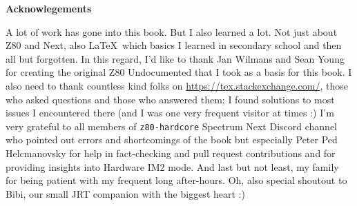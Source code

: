 \begingroup

	\textbf{Acknowlegements}

	A lot of work has gone into this book. But I also learned a lot. Not just about Z80 and Next, also \LaTeX~which basics I learned in secondary school and then all but forgotten. In this regard, I'd like to thank Jan Wilmans and Sean Young for creating the original Z80 Undocumented that I took as a basis for this book. I also need to thank countless kind folks on \url{https://tex.stackexchange.com/}, those who asked questions and those who answered them; I found solutions to most issues I encountered there (and I was one very frequent visitor at times :) I'm very grateful to all members of {\tt z80-hardcore} Spectrum Next Discord channel who pointed out errors and shortcomings of the book but especially  Peter Ped Helcmanovsky for help in fact-checking and pull request contributions and  for providing insights into Hardware IM2 mode. And last but not least, my family for being patient with my frequent long after-hours. Oh, also special shoutout to Bibi, our small JRT companion with the biggest heart :)

	\WorkInProgressFullScreen

\endgroup
